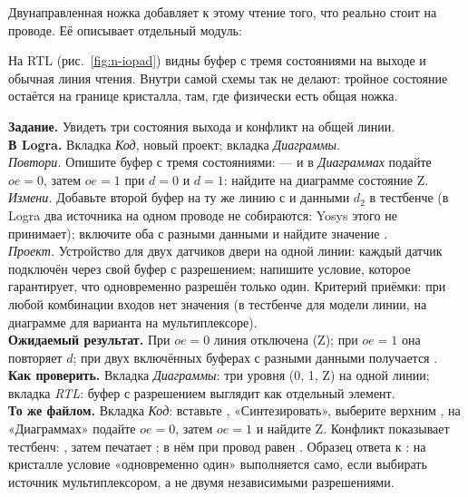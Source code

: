 Двунаправленная ножка добавляет к этому чтение того, что реально стоит на
проводе. Её описывает отдельный модуль:



На RTL (рис.~\ref{fig:n-iopad}) видны буфер с тремя состояниями на выходе и
обычная линия чтения. Внутри самой схемы так не делают: тройное состояние
остаётся на границе кристалла, там, где физически есть общая ножка.

\begin{diybox}
\textbf{Задание.} Увидеть три состояния выхода и конфликт на общей линии.\\
\textbf{В Logra.} Вкладка \emph{Код}, новый проект; вкладка \emph{Диаграммы}.\\
 \emph{Повтори.} Опишите буфер с тремя состояниями:
 --- и в \emph{Диаграммах} подайте $oe=0$,
затем $oe=1$ при $d=0$ и $d=1$: найдите на диаграмме состояние Z.\\
 \emph{Измени.} Добавьте второй буфер на ту же линию с
 и данными $d_2$ в тестбенче (в Logra два источника на одном проводе
не собираются: Yosys этого не принимает); включите оба с разными данными и
найдите значение .\\
 \emph{Проект.} Устройство для двух датчиков двери на одной линии:
каждый датчик подключён через свой буфер с разрешением; напишите условие,
которое гарантирует, что одновременно разрешён только один. Критерий
приёмки: при любой комбинации входов нет значения  (в тестбенче для
модели линии, на диаграмме для варианта на мультиплексоре).\\
\textbf{Ожидаемый результат.} При $oe=0$ линия отключена (Z); при $oe=1$ она
повторяет $d$; при двух включённых буферах с разными данными получается .\\
\textbf{Как проверить.} Вкладка \emph{Диаграммы}: три уровня (0, 1, Z) на
одной линии; вкладка \emph{RTL}: буфер с разрешением выглядит как отдельный
элемент.\\
\textbf{То же файлом.} Вкладка \emph{Код}: вставьте ,
«Синтезировать», выберите верхним , на «Диаграммах» подайте
$oe = 0$, затем $oe = 1$ и найдите Z. Конфликт показывает тестбенч:
, затем 
печатает ; в нём при  провод равен
. Образец ответа к : на кристалле условие «одновременно один»
выполняется само, если выбирать источник мультиплексором, а не двумя
независимыми разрешениями.
\end{diybox}

